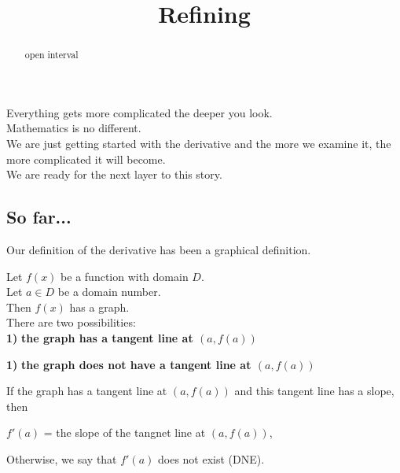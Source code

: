 \documentclass{ximera}
\title{Refining}
\begin{document}
\begin{abstract}
open interval
\end{abstract}
\maketitle



Everything gets more complicated the deeper you look. \\


Mathematics is no different. \\


We are just getting started with the derivative and the more we examine it, the more complicated it will become. \\

We are ready for the next layer to this story. \\




\subsection{So far...}


Our definition of the derivative has been a graphical definition.

\begin{idea}

Let $f(x)$ be a function with domain $D$. \\
Let $a \in D$ be a domain number. \\

Then $f(x)$ has a graph. \\

There are two possibilities:  \\


\textbf{\textcolor{blue!55!black}{1)}} \textbf{the graph has a tangent line at $(a, f(a))$}

\textbf{\textcolor{blue!55!black}{1)}} \textbf{the graph does not have a tangent line at $(a, f(a))$}




If the graph has a tangent line at $(a, f(a))$ and this tangent line has a slope, then


\begin{center}

$f'(a)$ = the slope of the tangnet line at $(a, f(a))$,

\end{center}



Otherwise, we say that $f'(a)$ does not exist (DNE).






\end{idea}
\end{document}
